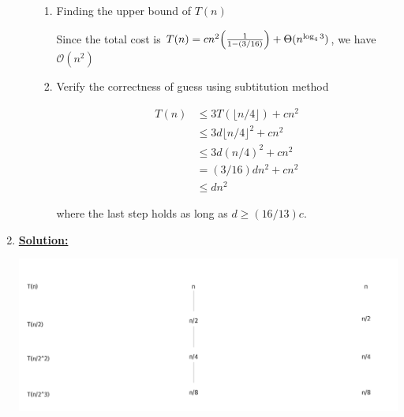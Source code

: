 \documentclass[12pt]{article}
\begin{document}
\begin{enumerate}[1.]
\begin{itemize}
\begin{enumerate}[1.]
            \item Finding the upper bound of $T(n)$

            \bigskip

            Since the total cost is $ T(n) = cn^2 \Bigl(\frac{1}{1 - (3/16)} \Bigr) + \Theta(n^{\log_4 3})$,
            we have $\mathcal{O}(n^2)$

            \bigskip

            \item Verify the correctness of guess using subtitution method

            \bigskip

            \begin{align}
                T(n) &\leq 3T(\lfloor n/4 \rfloor) + cn^2\\
                &\leq 3d \lfloor n/4 \rfloor^2 + cn^2\\
                &\leq 3d (n/4)^2 + cn^2\\
                &= (3/16) dn^2 + cn^2\\
                &\leq dn^2
            \end{align}

            \bigskip

            where the last step holds as long as $d \geq (16/13)c$.
        \end{enumerate}


    \end{itemize}

    \item

    \setcounter{equation}{0}

    \bigskip

    \underline{\textbf{Solution:}}

    \bigskip

    \begin{center}
    \includegraphics[width=\linewidth]{images/worksheet_0_solution_5.png}
    \end{center}


\end{enumerate}
\end{document}

